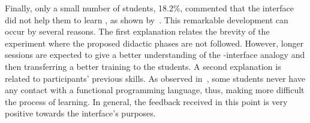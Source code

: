 Finally, only a small number of students, 18.2\%, commented that the
interface did not help them to learn \erlang, as shown
by~. This remarkable development can occur by
several reasons. The first explanation relates the brevity of the
experiment where the proposed didactic phases are not followed.
However, longer sessions are expected to give a better understanding
of the \erlang-interface analogy and then transferring a
better training to the students. A second explanation is related to
participants' previous skills. As observed in~,
some students never have any contact with a functional programming
language, thus, making more difficult the process of learning. In
general, the feedback received in this point is very positive towards
the interface's purposes.
